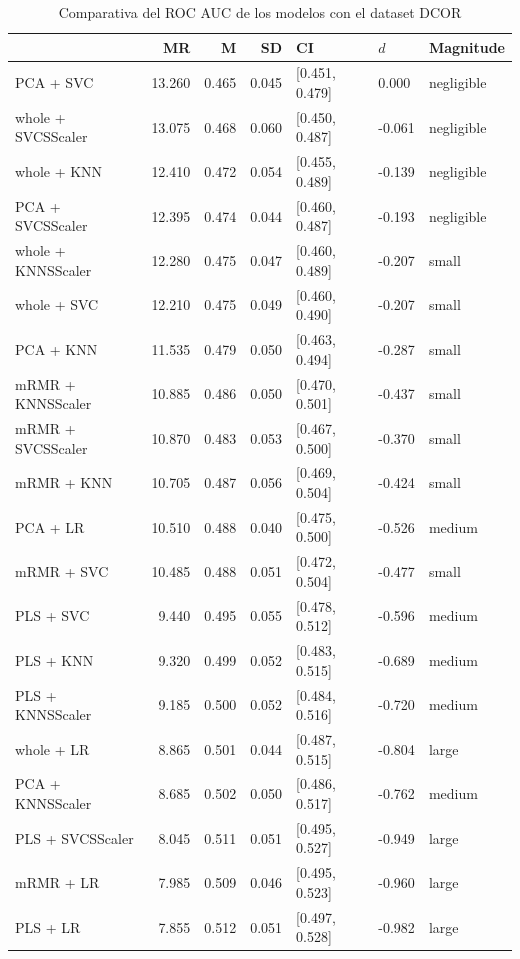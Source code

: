 \documentclass[a4paper,oneside,11pt,leqno]{article}
\begin{document}
	\begin{table}[h]
		\centering
		\begin{tabular}{lrrrlll}
			\toprule
			{} &     MR &     M &    SD &              CI &    $d$ &   Magnitude \\
			\midrule
			PCA + SVC          & 13.260 & 0.465 & 0.045 &  [0.451, 0.479] &  0.000 &  negligible \\
			whole + SVCSScaler & 13.075 & 0.468 & 0.060 &  [0.450, 0.487] & -0.061 &  negligible \\
			whole + KNN        & 12.410 & 0.472 & 0.054 &  [0.455, 0.489] & -0.139 &  negligible \\
			PCA + SVCSScaler   & 12.395 & 0.474 & 0.044 &  [0.460, 0.487] & -0.193 &  negligible \\
			whole + KNNSScaler & 12.280 & 0.475 & 0.047 &  [0.460, 0.489] & -0.207 &       small \\
			whole + SVC        & 12.210 & 0.475 & 0.049 &  [0.460, 0.490] & -0.207 &       small \\
			PCA + KNN          & 11.535 & 0.479 & 0.050 &  [0.463, 0.494] & -0.287 &       small \\
			mRMR + KNNSScaler  & 10.885 & 0.486 & 0.050 &  [0.470, 0.501] & -0.437 &       small \\
			mRMR + SVCSScaler  & 10.870 & 0.483 & 0.053 &  [0.467, 0.500] & -0.370 &       small \\
			mRMR + KNN         & 10.705 & 0.487 & 0.056 &  [0.469, 0.504] & -0.424 &       small \\
			PCA + LR           & 10.510 & 0.488 & 0.040 &  [0.475, 0.500] & -0.526 &      medium \\
			mRMR + SVC         & 10.485 & 0.488 & 0.051 &  [0.472, 0.504] & -0.477 &       small \\
			PLS + SVC          &  9.440 & 0.495 & 0.055 &  [0.478, 0.512] & -0.596 &      medium \\
			PLS + KNN          &  9.320 & 0.499 & 0.052 &  [0.483, 0.515] & -0.689 &      medium \\
			PLS + KNNSScaler   &  9.185 & 0.500 & 0.052 &  [0.484, 0.516] & -0.720 &      medium \\
			whole + LR         &  8.865 & 0.501 & 0.044 &  [0.487, 0.515] & -0.804 &       large \\
			PCA + KNNSScaler   &  8.685 & 0.502 & 0.050 &  [0.486, 0.517] & -0.762 &      medium \\
			PLS + SVCSScaler   &  8.045 & 0.511 & 0.051 &  [0.495, 0.527] & -0.949 &       large \\
			mRMR + LR          &  7.985 & 0.509 & 0.046 &  [0.495, 0.523] & -0.960 &       large \\
			PLS + LR           &  7.855 & 0.512 & 0.051 &  [0.497, 0.528] & -0.982 &       large \\
			\bottomrule
		\end{tabular}
		\caption{Comparativa del ROC AUC de los modelos con el dataset DCOR}
		\label{tab:stat_results_dcor}
	\end{table}
	
\end{document}
